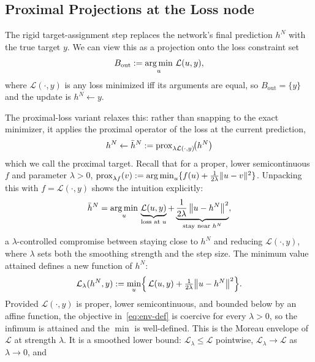 \subsection{Proximal Projections at the Loss node}
\label{sec:moreau}
The rigid target-assignment step replaces the network's final prediction
$h^{N}$ with the true target $y$. We can view this as a projection onto the
loss constraint set
\begin{equation}
B_{\mathrm{out}} := \operatorname*{arg\,min}_u\, \mathcal{L}(u,y),
\label{eq:loss-set}
\end{equation}
where $\mathcal{L}(\cdot,y)$ is any loss minimized iff its arguments are
equal, so $B_{\mathrm{out}}=\{y\}$ and the update is $h^{N}\leftarrow y$.

The proximal-loss \cite{bergmeister2025projection} variant relaxes this:
rather than snapping to the exact minimizer, it applies the proximal operator
of the loss at the current prediction,
\begin{equation}
h^{N}\leftarrow\bar h^{N} := \operatorname{prox}_{\lambda\mathcal{L}(\cdot,y)}\!\bigl(h^{N}\bigr)
\label{eq:prox-update}
\end{equation}
which we call the proximal target. Recall that for a proper, lower
semicontinuous $f$ and parameter $\lambda>0$,
$\operatorname{prox}_{\lambda f}(v):=\operatorname*{arg\,min}_{u}\{f(u)+\tfrac{1}{2\lambda}\|u-v\|^{2}\}$.
Unpacking this with $f=\mathcal{L}(\cdot,y)$ shows the intuition explicitly:
\begin{equation}
\bar h^{N} = \operatorname*{arg\,min}_{u}\,
\underbrace{\mathcal{L}(u,y)}_{\text{loss at }u}
+
\underbrace{\frac{1}{2\lambda}\,\bigl\|u-h^{N}\bigr\|^{2}}_{\text{stay near }h^{N}} ,
\label{eq:prox-def}
\end{equation}
a $\lambda$-controlled compromise between staying close to $h^{N}$ and reducing
$\mathcal{L}(\cdot,y)$, where $\lambda$ sets both the smoothing strength and the
step size. The minimum value attained defines a new function of $h^{N}$:
\begin{equation}
\mathcal{L}_{\lambda}(h^{N},y)
:=
\min_{u}\Bigl\{\,\mathcal{L}(u,y)+\tfrac{1}{2\lambda}\bigl\|u-h^{N}\bigr\|^{2}\Bigr\}.
\label{eq:env-def}
\end{equation}
Provided $\mathcal{L}(\cdot,y)$ is proper, lower semicontinuous, and bounded
below by an affine function, the objective in~\eqref{eq:env-def} is coercive
for every $\lambda>0$, so the infimum is attained and the $\min$ is
well-defined. This is the Moreau envelope of $\mathcal{L}$ at strength
$\lambda$. It is a smoothed lower bound: $\mathcal{L}_{\lambda}\le\mathcal{L}$
pointwise, $\mathcal{L}_{\lambda}\to\mathcal{L}$ as $\lambda\to 0$, and
